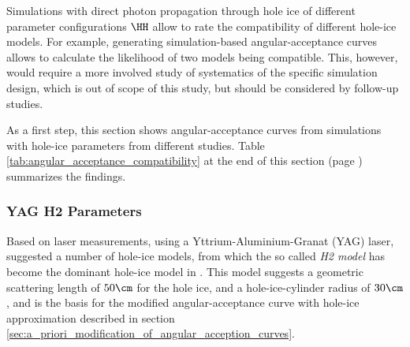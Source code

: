 \newcommand\ok{\ding{51}} %
\newcommand\same{\cellcolor{black!25}}
\newcommand\greyedout{\cellcolor{black!25}}
\newcommand\bad{\ding{55}}

\newcommand\clsimppc{\noun{clsim+ppc}}

Simulations with direct photon propagation through hole ice of different parameter configurations $\HH$ allow to rate the compatibility of different hole-ice models. For example, generating simulation-based angular-acceptance curves allows to calculate the likelihood of two models being compatible. This, however, would require a more involved study of systematics of the specific simulation design, which is out of scope of this study, but should be considered by follow-up studies.\followup

As a first step, this section shows angular-acceptance curves from simulations with hole-ice parameters from different studies. Table \ref{tab:angular_acceptance_compatibility} at the end of this section (page \pageref{tab:angular_acceptance_compatibility}) summarizes the findings.


%
%
%
%
%
%
\subsubsection{YAG H2 Parameters}
\label{sec:yag_h2_parameters}
Based on laser measurements, using a Yttrium-Aluminium-Granat (YAG) laser, \cite{holeicestudieswithyag} suggested a number of hole-ice models, from which the so called \textit{H2 model} has become the dominant hole-ice model in \icecube. This model suggests a geometric scattering length of $50\cm$ for the hole ice, and a hole-ice-cylinder radius of $30\cm$, and is the basis for the modified angular-acceptance curve with hole-ice approximation described in section \ref{sec:a_priori_modification_of_angular_acception_curves}.

